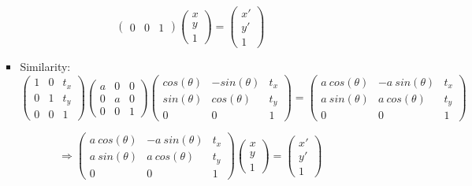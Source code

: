 \documentclass[12pt]{article}
\begin{document}
\begin{enumerate}[leftmargin=\labelsep]
\begin{enumerate}
\begin{itemize}
\begin{equation}
\begin{pmatrix}
                0 & 0 & 1
                \end{pmatrix}
                \begin{pmatrix}
                    x \\
                    y \\
                    1 
                \end{pmatrix}
                =
                    \begin{pmatrix}
                    x' \\
                    y' \\
                    1 
                    \end{pmatrix}
            \end{equation}
        \item Similarity:
        \begin{equation}
        \begin{pmatrix}
    1 & 0 &  t_x \\
    0 & 1 & t_y \\
0 & 0 & 1
\end{pmatrix}
\begin{pmatrix}
a & 0 &  0 \\
0 & a & 0 \\
0 & 0 & 1
\end{pmatrix}
\begin{pmatrix}
cos(\theta) & -sin(\theta) &  t_x \\
sin(\theta) & cos(\theta) & t_y \\
0 & 0 & 1
\end{pmatrix}
=
\begin{pmatrix}
a\ cos(\theta) & -a\ sin(\theta) &  t_x \\
a\ sin(\theta) & a\ cos(\theta) & t_y \\
0 & 0 & 1
\end{pmatrix}
\end{equation}

    \begin{equation}
    \Rightarrow 
\begin{pmatrix}
a\ cos(\theta) & -a\ sin(\theta) &  t_x \\
a\ sin(\theta) & a\ cos(\theta) & t_y \\
0 & 0 & 1
\end{pmatrix}
\begin{pmatrix}
        x \\
        y \\
        1 
        \end{pmatrix}
        =
        \begin{pmatrix}
        x' \\
        y' \\
        1 
        \end{pmatrix}
\end{equation}


\end{itemize}
\end{enumerate}
\end{enumerate}
\end{document}
